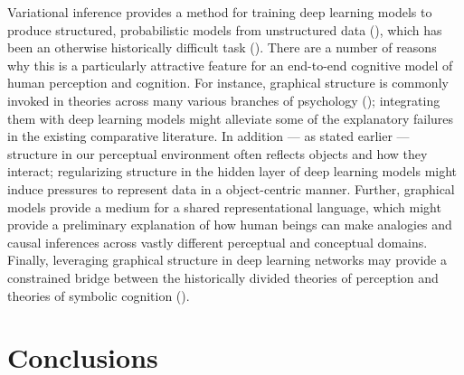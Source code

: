\documentclass[12pt]{article}
\let\oldcite=\cite
\renewcommand{\cite}[1]{\textcolor[rgb]{0, .121, .388}{\oldcite{#1}}}
\begin{document}
Variational inference provides a method for training deep learning models to produce structured, probabilistic models from unstructured data (\cite{kingma2013auto,johnson2016composing}), which has been an otherwise historically difficult task (\cite{hinton1981shape,hummel2004solution}). There are a number of reasons why this is a particularly attractive feature for an end-to-end cognitive model of human perception and cognition. For instance,  graphical structure is commonly invoked in theories across many various branches of psychology (\cite{quillian1967word,collins1975spreading,vitevitch2008can,biederman1987recognition,danks2014unifying}); integrating them with deep learning models might alleviate some of the explanatory failures in the existing comparative literature. In addition --- as stated earlier --- structure in our perceptual environment often reflects objects and how they interact; regularizing structure in the hidden layer of deep learning models might induce pressures to represent data in a object-centric manner. Further, graphical models provide a medium for a shared representational language, which might provide a preliminary explanation of how human beings can make analogies and causal inferences across vastly different perceptual and conceptual domains. Finally, leveraging graphical structure in deep learning networks may provide a constrained bridge between the historically divided theories of perception and theories of symbolic cognition (\cite{goldstone1998reuniting}).




\section{Conclusions}


\end{document}
